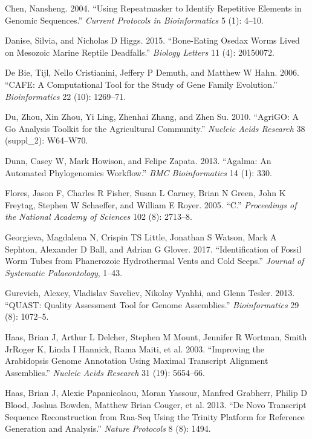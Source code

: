 \documentclass[]{article}
\begin{document}
\leavevmode\hypertarget{ref-chen2004using}{}%
Chen, Nansheng. 2004. ``Using Repeatmasker to Identify Repetitive
Elements in Genomic Sequences.'' \emph{Current Protocols in
Bioinformatics} 5 (1): 4--10.

\leavevmode\hypertarget{ref-danise2015bone}{}%
Danise, Silvia, and Nicholas D Higgs. 2015. ``Bone-Eating Osedax Worms
Lived on Mesozoic Marine Reptile Deadfalls.'' \emph{Biology Letters} 11
(4): 20150072.

\leavevmode\hypertarget{ref-de2006cafe}{}%
De Bie, Tijl, Nello Cristianini, Jeffery P Demuth, and Matthew W Hahn.
2006. ``CAFE: A Computational Tool for the Study of Gene Family
Evolution.'' \emph{Bioinformatics} 22 (10): 1269--71.

\leavevmode\hypertarget{ref-du2010agrigo}{}%
Du, Zhou, Xin Zhou, Yi Ling, Zhenhai Zhang, and Zhen Su. 2010. ``AgriGO:
A Go Analysis Toolkit for the Agricultural Community.'' \emph{Nucleic
Acids Research} 38 (suppl\_2): W64--W70.

\leavevmode\hypertarget{ref-dunn2013agalma}{}%
Dunn, Casey W, Mark Howison, and Felipe Zapata. 2013. ``Agalma: An
Automated Phylogenomics Workflow.'' \emph{BMC Bioinformatics} 14 (1):
330.

\leavevmode\hypertarget{ref-flores2005sulfide}{}%
Flores, Jason F, Charles R Fisher, Susan L Carney, Brian N Green, John K
Freytag, Stephen W Schaeffer, and William E Royer. 2005. ``C.''
\emph{Proceedings of the National Academy of Sciences} 102 (8): 2713--8.

\leavevmode\hypertarget{ref-georgieva2017identification}{}%
Georgieva, Magdalena N, Crispin TS Little, Jonathan S Watson, Mark A
Sephton, Alexander D Ball, and Adrian G Glover. 2017. ``Identification
of Fossil Worm Tubes from Phanerozoic Hydrothermal Vents and Cold
Seeps.'' \emph{Journal of Systematic Palaeontology}, 1--43.

\leavevmode\hypertarget{ref-gurevich2013quast}{}%
Gurevich, Alexey, Vladislav Saveliev, Nikolay Vyahhi, and Glenn Tesler.
2013. ``QUAST: Quality Assessment Tool for Genome Assemblies.''
\emph{Bioinformatics} 29 (8): 1072--5.

\leavevmode\hypertarget{ref-haas2003improving}{}%
Haas, Brian J, Arthur L Delcher, Stephen M Mount, Jennifer R Wortman,
Smith JrRoger K, Linda I Hannick, Rama Maiti, et al. 2003. ``Improving
the Arabidopsis Genome Annotation Using Maximal Transcript Alignment
Assemblies.'' \emph{Nucleic Acids Research} 31 (19): 5654--66.

\leavevmode\hypertarget{ref-haas2013novo}{}%
Haas, Brian J, Alexie Papanicolaou, Moran Yassour, Manfred Grabherr,
Philip D Blood, Joshua Bowden, Matthew Brian Couger, et al. 2013. ``De
Novo Transcript Sequence Reconstruction from Rna-Seq Using the Trinity
Platform for Reference Generation and Analysis.'' \emph{Nature
Protocols} 8 (8): 1494.
\end{document}
